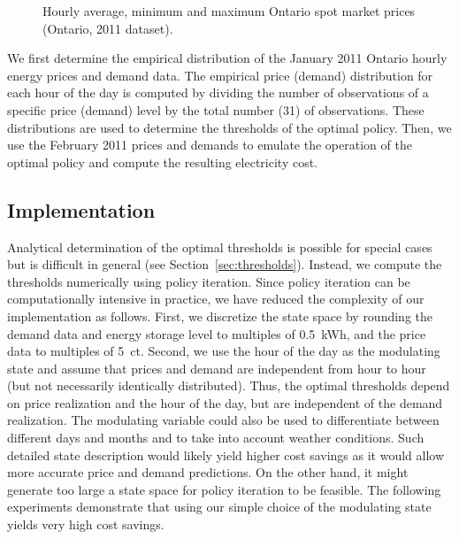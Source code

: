 \documentclass[journal]{IEEEtran}
\newcommand\1{\mathbf{1}}
\begin{document}
\begin{figure}[h]
    \begin{center}
        \hspace{0.2cm}
    \end{center}
    \caption{Hourly average, minimum and maximum Ontario spot market prices (Ontario, 2011 dataset).}
    \label{fig:ontario_price}
\end{figure}

We first determine the empirical distribution of the January
2011 Ontario hourly energy prices and demand data. The empirical price (demand) distribution for each hour of the day
is computed by dividing the number of observations of a specific price (demand) level by the total number (31)
of observations. These distributions are used to determine the thresholds of the optimal policy.
Then, we use the February 2011 prices and demands to emulate the operation of the
optimal policy and compute the resulting electricity cost.


\subsection{Implementation}

Analytical determination of the optimal thresholds is possible for special cases but is difficult in general (see Section~\ref{sec:thresholds}). Instead, we compute the thresholds numerically using policy iteration.
Since policy iteration can be computationally intensive in practice, we have reduced the complexity of our implementation as follows.  First, we discretize the state space by rounding the demand data and energy storage level to multiples of 0.5~kWh, and the price data to multiples of 5~ct.  Second, we use the hour of the day as the modulating state and assume that prices and demand are independent from hour to hour (but not necessarily identically distributed). Thus, the optimal thresholds depend on price realization and the hour of the day, but are independent of the demand realization.
The modulating variable  could also be used to differentiate between different days and months and to take into account weather conditions. Such detailed state description would likely yield higher cost savings as it would allow more accurate price and demand predictions. On the other hand, it might generate too large a state space for policy iteration to be feasible. The following experiments demonstrate that using our simple choice of the modulating state yields very high cost savings.
\end{document}
